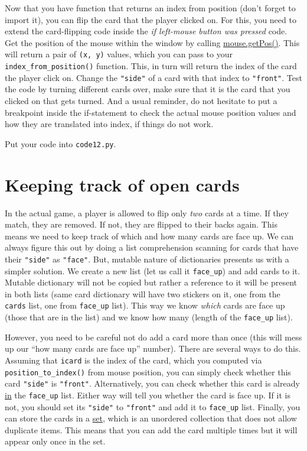 \documentclass[
]{book}
\begin{document}
Now that you have function that returns an index from position (don't forget to import it), you can flip the card that the player clicked on. For this, you need to extend the card-flipping code inside the \emph{if left-mouse button was pressed} code. Get the position of the mouse within the window by calling \href{https://psychopy.org/api/event.html\#psychopy.event.Mouse.getPos}{mouse.getPos()}. This will return a pair of \texttt{(x,\ y)} values, which you can pass to your \texttt{index\_from\_position()} function. This, in turn will return the index of the card the player click on. Change the \texttt{"side"} of a card with that index to \texttt{"front"}. Test the code by turning different cards over, make sure that it is the card that you clicked on that gets turned. And a usual reminder, do not hesitate to put a breakpoint inside the if-statement to check the actual mouse position values and how they are translated into index, if things do not work.

Put your code into \texttt{code12.py}.

\hypertarget{keeping-track-of-open-cards}{%
\section{Keeping track of open cards}\label{keeping-track-of-open-cards}}

In the actual game, a player is allowed to flip only \emph{two} cards at a time. If they match, they are removed. If not, they are flipped to their backs again. This means we need to keep track of which and how many cards are face up. We can always figure this out by doing a list comprehension scanning for cards that have their \texttt{"side"} as \texttt{"face"}. But, mutable nature of dictionaries presents us with a simpler solution. We create a new list (let us call it \texttt{face\_up}) and add cards to it. Mutable dictionary will not be copied but rather a reference to it will be present in both lists (same card dictionary will have two stickers on it, one from the \texttt{cards} list, one from \texttt{face\_up} list). This way we know \emph{which} cards are face up (those that are in the list) and we know how many (length of the \texttt{face\_up} list).

However, you need to be careful not do add a card more than once (this will mess up our ``how many cards are face up'' number). There are several ways to do this. Assuming that \texttt{icard} is the index of the card, which you computed via \texttt{position\_to\_index()} from mouse position, you can simply check whether this card \texttt{"side"} is \texttt{"front"}. Alternatively, you can check whether this card is already \href{https://docs.python.org/3/reference/expressions.html?highlight=list\%20dictionary\#in}{in} the \texttt{face\_up} list. Either way will tell you whether the card is face up. If it is not, you should set its \texttt{"side"} to \texttt{"front"} and add it to \texttt{face\_up} list. Finally, you can store the cards in a \href{https://docs.python.org/3/tutorial/datastructures.html\#sets}{set}, which is an unordered collection that does not allow duplicate items. This means that you can add the card multiple times but it will appear only once in the set.
\end{document}
